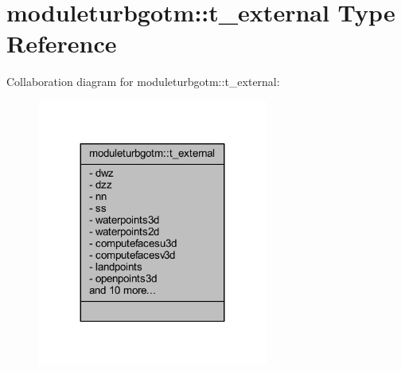 \hypertarget{structmoduleturbgotm_1_1t__external}{}\section{moduleturbgotm\+:\+:t\+\_\+external Type Reference}
\label{structmoduleturbgotm_1_1t__external}


Collaboration diagram for moduleturbgotm\+:\+:t\+\_\+external\+:\nopagebreak
\begin{figure}[H]
\begin{center}
\leavevmode
\includegraphics[width=215pt]{structmoduleturbgotm_1_1t__external__coll__graph}
\end{center}
\end{figure}
